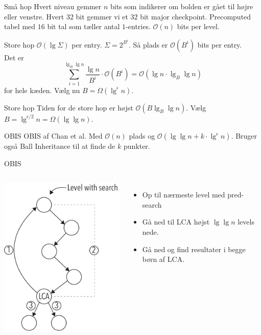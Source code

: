 \documentclass[pdf]{beamer}
\begin{document}
\begin{frame}{Små hop}
  Hvert niveau gemmer $n$ bits som indikerer om bolden er gået til højre eller venstre. Hvert $32$ bit gemmer vi et $32$ bit major checkpoint. Precomputed tabel med $16$ bit tal som tæller antal $1$-entries. $\mathcal{O}(n)$ bits per level.
\end{frame}

\begin{frame}{Store hop}
  $\mathcal{O}(\lg \Sigma)$ per entry. $\Sigma = 2^{B^i}$. Så plads er $\mathcal{O}(B^i)$ bits per entry.\\

  Det er $$\sum_{i=1}^{\lg_B \lg n} \frac{\lg n}{B^i}\cdot\mathcal{O}(B^i) = \mathcal{O}(\lg n \cdot \lg_B \lg n)$$ for hele kæden. Vælg nu $B = \Omega(\lg^\epsilon n)$.
\end{frame}

\begin{frame}{Store hop}
  Tiden for de store hop er højst $\mathcal{O}(B \lg_B \lg n)$. Vælg $B = \lg^{\epsilon / 2} n = \Omega(\lg \lg n)$.
\end{frame}

\begin{frame}{OBIS}
  OBIS af Chan et al. Med $\mathcal{O}(n)$ plads og $\mathcal{O}(\lg \lg n + k\cdot\lg^\epsilon n)$. Bruger også Ball Inheritance til at finde de $k$ punkter.
\end{frame}

\begin{frame}{OBIS}
  \begin{columns}
    \includegraphics{pictures/ors_step2-eps-converted-to.pdf}
    \begin{itemize}
      \item Op til nærmeste level med pred-search
      \item Gå ned til LCA højst $\lg \lg n$ levels nede.
      \item Gå ned og find resultater i begge børn af LCA.
    \end{itemize}

  \end{columns}
\end{frame}
\end{document}
